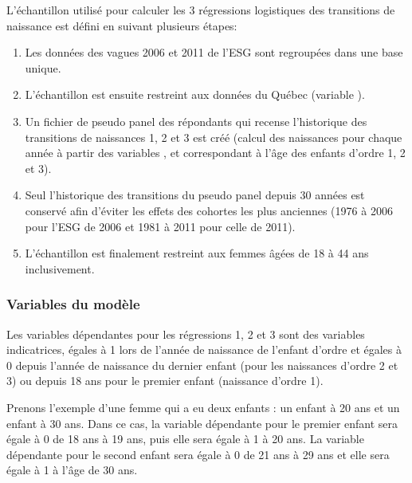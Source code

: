 \documentclass[letterpaper,10pt,french]{sphinxmanual}
\begin{document}
L’échantillon utilisé pour calculer les 3 régressions logistiques des transitions de naissance est défini en suivant plusieurs étapes:
\begin{enumerate}
%
\item {} 
Les données des vagues 2006 et 2011 de l’ESG sont regroupées dans une base unique.

\item {} 
L’échantillon est ensuite restreint aux données du Québec (variable ).

\item {} 
Un fichier de pseudo panel des répondants qui recense l’historique des transitions de naissances 1, 2 et 3 est créé (calcul des naissances pour chaque année à partir des variables ,  et  correspondant à l’âge des enfants d’ordre 1, 2 et 3).

\item {} 
Seul l’historique des transitions du pseudo panel depuis 30 années est conservé afin d’éviter les effets des cohortes les plus anciennes
(1976 à 2006 pour l’ESG de 2006 et 1981 à 2011 pour celle de 2011).

\item {} 
L’échantillon est finalement restreint aux femmes âgées de 18 à 44 ans inclusivement.

\end{enumerate}


\subsubsection{Variables du modèle}
\label{\detokenize{methodologie:variables-du-modele}}
Les variables dépendantes pour les régressions 1, 2 et 3 sont des variables indicatrices,
égales à 1 lors de l’année de naissance de l’enfant d’ordre 
et égales à 0 depuis l’année de naissance du dernier enfant (pour les naissances d’ordre 2 et 3) ou
depuis 18 ans pour le premier enfant (naissance d’ordre 1).

Prenons l’exemple d’une femme qui a eu deux enfants : un enfant à 20 ans et un enfant à 30 ans.
Dans ce cas, la variable dépendante pour le premier enfant sera égale à 0 de 18 ans à 19 ans, puis elle sera égale à 1 à 20 ans.
La variable dépendante pour le second enfant sera égale à 0 de 21 ans à 29 ans et elle sera égale à 1 à l’âge de 30 ans.
\end{document}
